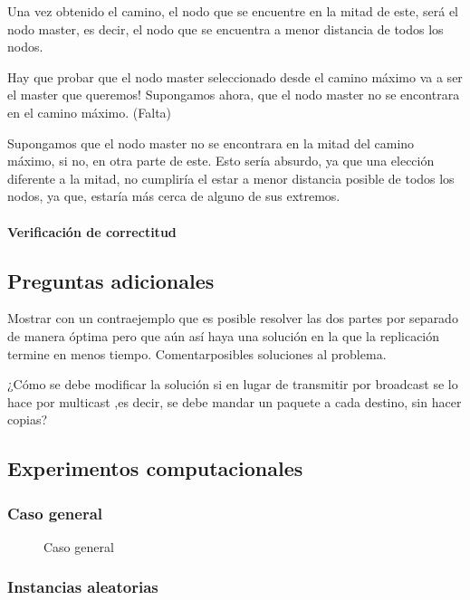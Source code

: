 \documentclass[a4paper, 10pt, twoside]{article}
\newcommand{\dosgraficos}[2]{
    \newcommand{\separacion}{-2.2em}
    \vspace{\separacion}
    
    \vspace{\separacion}
    
}
\begin{document}
Una vez obtenido el camino, el nodo que se encuentre en la mitad de este, será el nodo master, es decir, el nodo que se encuentra a menor distancia de todos los nodos.

Hay que probar que el nodo master seleccionado desde el camino máximo va a ser el master que queremos!
Supongamos ahora, que el nodo master no se encontrara en el camino máximo. (Falta)

Supongamos que el nodo master no se encontrara en la mitad del camino máximo, si no, en otra parte de este. Esto sería absurdo, ya que una elección diferente a la mitad, no cumpliría el estar a menor distancia posible de todos los nodos, ya que, estaría más cerca de alguno de sus extremos.

\paragraph{Verificación de correctitud}

\subsection{Preguntas adicionales}
Mostrar con un contraejemplo que es posible resolver las dos partes por separado de manera óptima pero que aún así haya una solución en la que la replicación termine en menos tiempo. Comentarposibles soluciones al problema.


¿Cómo se debe modificar la solución si en lugar de transmitir por broadcast se lo hace por
multicast ,es decir, se debe mandar un paquete a cada destino, sin hacer copias?


\subsection{Experimentos computacionales}


\subsubsection{Caso general}

\begin{figure}[H]
  \centering
  \dosgraficos{problema2-caso-general}
              {problema2-caso-general-n}
  \caption{Caso general}
\end{figure}


\subsubsection{Instancias aleatorias}
\end{document}
